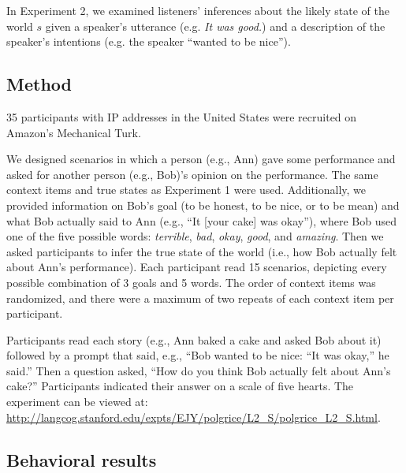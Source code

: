 \documentclass[10pt,letterpaper]{article}
\begin{document}
In Experiment 2, we examined listeners' inferences about the likely state of the world $s$ given a speaker's utterance (e.g. \emph{It was good.}) and a description of the speaker's intentions (e.g. the speaker ``wanted to be nice'').

\subsection{Method}

35 participants with IP addresses in the United States were recruited on Amazon's Mechanical Turk.


We designed scenarios in which a person (e.g., Ann) gave some performance and asked for another person (e.g., Bob)'s opinion on the performance. The same context items and true states as Experiment 1 were used. Additionally, we provided information on Bob's goal (to be honest, to be nice, or to be mean) and what Bob actually said to Ann (e.g., ``It [your cake] was okay''), where Bob used one of the five possible words: \emph{terrible}, \emph{bad}, \emph{okay}, \emph{good}, and \emph{amazing}. Then we asked participants to infer the true state of the world (i.e., how Bob actually felt about Ann's performance). Each participant read 15 scenarios, depicting every possible combination of 3 goals and 5 words. The order of context items was randomized, and there were a maximum of two repeats of each context item per participant.

Participants read each story (e.g., Ann baked a cake and asked Bob about it) followed by a prompt that said,
e.g., ``Bob wanted to be nice: ``It was okay,'' he said.''
Then a question asked, ``How do you think Bob actually felt about Ann's cake?''
Participants indicated their answer on a scale of five hearts. 
The experiment can be viewed at: \url{http://langcog.stanford.edu/expts/EJY/polgrice/L2_S/polgrice_L2_S.html}.

\subsection{Behavioral results}
\end{document}

